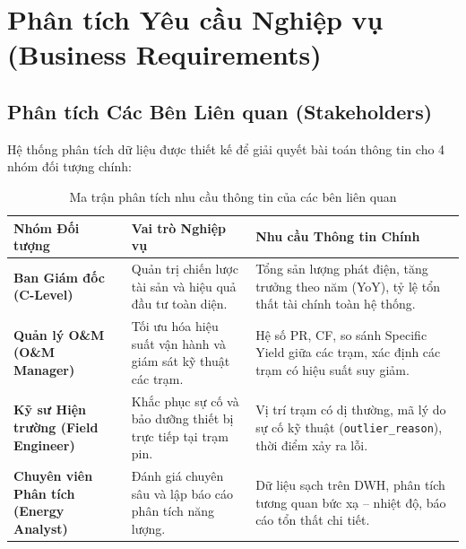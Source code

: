 \documentclass[12pt, a4paper]{report}
\begin{document}
\section{Phân tích Yêu cầu Nghiệp vụ (Business Requirements)}
\label{sec:yeucau_nghiepvu}

\subsection{Phân tích Các Bên Liên quan (Stakeholders)}
Hệ thống phân tích dữ liệu được thiết kế để giải quyết bài toán thông tin cho 4 nhóm đối tượng chính:

\begin{table}[H]
\centering
\caption{Ma trận phân tích nhu cầu thông tin của các bên liên quan}
\label{tab:stakeholder_matrix}
\small
\renewcommand{\arraystretch}{1.25}
\begin{tabularx}{\textwidth}{@{} l p{4.5cm} X @{}}
\toprule
\textbf{Nhóm Đối tượng} & \textbf{Vai trò Nghiệp vụ} & \textbf{Nhu cầu Thông tin Chính} \\
\midrule
\textbf{Ban Giám đốc (C-Level)} & 
Quản trị chiến lược tài sản và hiệu quả đầu tư toàn diện. & 
Tổng sản lượng phát điện, tăng trưởng theo năm (YoY), tỷ lệ tổn thất tài chính toàn hệ thống. \\
\midrule
\textbf{Quản lý O\&M (O\&M Manager)} & 
Tối ưu hóa hiệu suất vận hành và giám sát kỹ thuật các trạm. & 
Hệ số PR, CF, so sánh Specific Yield giữa các trạm, xác định các trạm có hiệu suất suy giảm. \\
\midrule
\textbf{Kỹ sư Hiện trường (Field Engineer)} & 
Khắc phục sự cố và bảo dưỡng thiết bị trực tiếp tại trạm pin. & 
Vị trí trạm có dị thường, mã lý do sự cố kỹ thuật (\texttt{outlier\_reason}), thời điểm xảy ra lỗi. \\
\midrule
\textbf{Chuyên viên Phân tích (Energy Analyst)} & 
Đánh giá chuyên sâu và lập báo cáo phân tích năng lượng. & 
Dữ liệu sạch trên DWH, phân tích tương quan bức xạ -- nhiệt độ, báo cáo tổn thất chi tiết. \\
\bottomrule
\end{tabularx}


\end{table}
\end{document}
